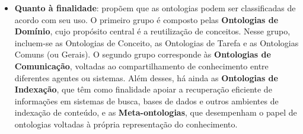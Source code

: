 \begin{itemize}
    \item \textbf{Quanto à finalidade}: \citeauthor{corcho2005building} propõem que as ontologias podem ser classificadas de acordo com seu uso. O primeiro grupo é composto pelas \textbf{Ontologias de Domínio}, cujo propósito central é a reutilização de conceitos. Nesse grupo, incluem-se as Ontologias de Conceito, as Ontologias de Tarefa e as Ontologias Comuns (ou Gerais). O segundo grupo corresponde às \textbf{Ontologias de Comunicação}, voltadas ao compartilhamento de conhecimento entre diferentes agentes ou sistemas. Além desses, há ainda as \textbf{Ontologias de Indexação}, que têm como finalidade apoiar a recuperação eficiente de informações em sistemas de busca, bases de dados e outros ambientes de indexação de conteúdo, e as \textbf{Meta-ontologias}, que desempenham o papel de ontologias voltadas à própria representação do conhecimento.
\end{itemize}

